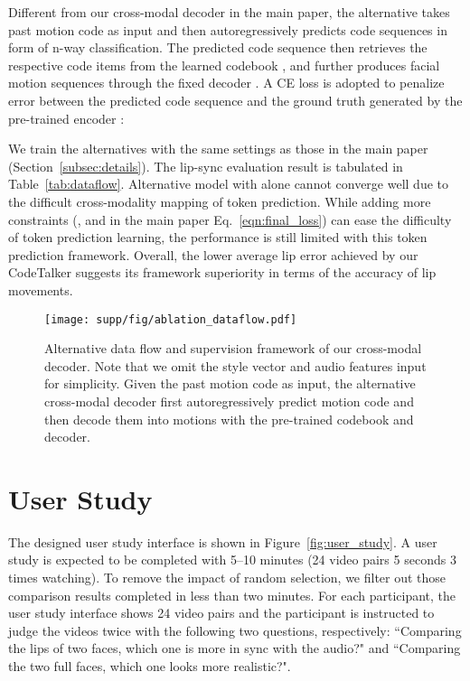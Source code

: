 Different from our cross-modal decoder in the main paper, the alternative takes past motion code as input and then autoregressively predicts code sequences in form of n-way classification. The predicted code sequence then retrieves the respective code items from the learned codebook , and further produces facial motion sequences through the fixed decoder . A CE loss is adopted to penalize error between the predicted code sequence  and the ground truth  generated by the pre-trained encoder :

We train the alternatives with the same settings as those in the main paper (Section~\ref{subsec:details}). The lip-sync evaluation result is tabulated in Table~\ref{tab:dataflow}. Alternative model with  alone cannot converge well due to the difficult cross-modality mapping of token prediction. While adding more constraints (\ie,  and  in the main paper Eq.~\ref{eqn:final_loss}) can ease the difficulty of token prediction learning, the performance is still limited with this token prediction framework. Overall, the lower average lip error achieved by our CodeTalker suggests its framework superiority in terms of the accuracy of lip movements.



\begin{figure}[!t]
    \centering
    \texttt{[image: supp/fig/ablation\_dataflow.pdf]}
    \caption{Alternative data flow and supervision framework of our cross-modal decoder. Note that we omit the style vector and audio features input for simplicity. Given the past motion code as input, the alternative cross-modal decoder first autoregressively predict motion code and then decode them into motions with the pre-trained codebook and decoder.}
    \label{fig:ablation_dataflow}
\end{figure}



\section{User Study}
\label{sec:user}
The designed user study interface is shown in Figure~\ref{fig:user_study}. A user study is expected to be completed with 5--10 minutes (24 video pairs  5 seconds  3 times watching). To remove the impact of random selection, we filter out those comparison results completed in less than two minutes. For each participant, the user study interface shows 24 video pairs and the participant is instructed to judge the videos twice with the following two questions, respectively: ``Comparing the lips of two faces, which one is more in sync with the audio?" and ``Comparing the two full faces, which one looks more realistic?".

